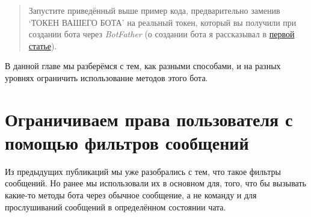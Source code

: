 \documentclass[
]{book}
\newenvironment{Shaded}{\begin{snugshade}}{\end{snugshade}}
\newcommand{\CommentTok}[1]{\textcolor[rgb]{0.56,0.35,0.01}{\textit{#1}}}
\newcommand{\FunctionTok}[1]{\textcolor[rgb]{0.00,0.00,0.00}{#1}}
\newcommand{\NormalTok}[1]{#1}
\newcommand{\OtherTok}[1]{\textcolor[rgb]{0.56,0.35,0.01}{#1}}
\newcommand{\SpecialCharTok}[1]{\textcolor[rgb]{0.00,0.00,0.00}{#1}}
\newcommand{\StringTok}[1]{\textcolor[rgb]{0.31,0.60,0.02}{#1}}
\begin{document}
\begin{Shaded}
\end{Shaded}

\begin{quote}
Запустите приведённый выше пример кода, предварительно заменив `ТОКЕН ВАШЕГО БОТА' на реальный токен, который вы получили при создании бота через \emph{BotFather} (о создании бота я рассказывал в \href{https://habr.com/ru/post/511222/\#sozdanie-telegram-bota}{первой статье}).
\end{quote}

В данной главе мы разберёмся с тем, как разными способами, и на разных уровнях ограничить использование методов этого бота.

\hypertarget{ux43eux433ux440ux430ux43dux438ux447ux438ux432ux430ux435ux43c-ux43fux440ux430ux432ux430-ux43fux43eux43bux44cux437ux43eux432ux430ux442ux435ux43bux44f-ux441-ux43fux43eux43cux43eux449ux44cux44e-ux444ux438ux43bux44cux442ux440ux43eux432-ux441ux43eux43eux431ux449ux435ux43dux438ux439}{%
\section{Ограничиваем права пользователя с помощью фильтров сообщений}\label{ux43eux433ux440ux430ux43dux438ux447ux438ux432ux430ux435ux43c-ux43fux440ux430ux432ux430-ux43fux43eux43bux44cux437ux43eux432ux430ux442ux435ux43bux44f-ux441-ux43fux43eux43cux43eux449ux44cux44e-ux444ux438ux43bux44cux442ux440ux43eux432-ux441ux43eux43eux431ux449ux435ux43dux438ux439}}

Из предыдущих публикаций мы уже разобрались с тем, что такое фильтры сообщений. Но ранее мы использовали их в основном для, того, что бы вызывать какие-то методы бота через обычное сообщение, а не команду и для прослушиваний сообщений в определённом состоянии чата.
\end{document}
